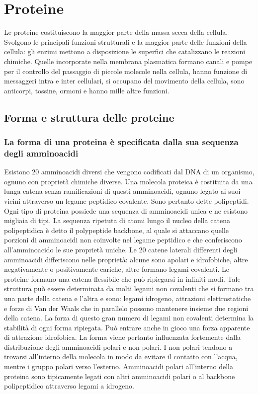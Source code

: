 \chapter{Proteine}
Le proteine costituiscono la maggior parte della massa secca della cellula. Svolgono le principali funzioni strutturali e la maggior parte delle funzioni
della cellula: gli enzimi mettono a disposizione le superfici che catalizzano le reazioni chimiche. Quelle incorporate nella membrana plasmatica formano 
canali e pompe per il controllo del passaggio di piccole molecole nella cellula, hanno funzione di messaggeri intra e inter cellulari, si occupano del
movimento della cellula, sono anticorpi, tossine, ormoni e hanno mille altre funzioni. 
\section{Forma e struttura delle proteine}
\subsection{La forma di una proteina \`e specificata dalla sua sequenza degli amminoacidi}
Esistono $20$ amminoacidi diversi che vengono codificati dal DNA di un organismo, ognuno con propriet\`a chimiche diverse. Una molecola proteica \`e
costituita da una lunga catena senza ramificazioni di questi amminoacidi, ognuno legato ai suoi vicini attraverso un legame peptidico covalente. Sono
pertanto dette polipeptidi. Ogni tipo di proteina possiede una sequenza di amminoacidi unica e ne esistono migliaia di tipi. La sequenza ripetuta di atomi 
lungo il nucleo della catena polipeptidica \`e detto il polypeptide backbone, al quale si attaccano quelle porzioni di amminoacidi non coinvolte nel 
legame peptidico e che conferiscono all'amminoacido le sue propriet\`a uniche. Le $20$ catene laterali differenti degli amminoacidi differiscono nelle
propriet\`a: alcune sono apolari e idrofobiche, altre negativamente o positivamente cariche, altre formano legami covalenti. Le proteine formano una 
catena flessibile che pu\`o ripiegarsi in infiniti modi. Tale struttura pu\`o essere determinata da molti legami non covalenti che si formano tra una 
parte della catena e l'altra e sono: legami idrogeno, attrazioni elettrostatiche e forze di Van der Waals che in parallelo possono mantenere insieme due 
regioni della catena. La forza di questo gran numero di legami non covalenti determina la stabilit\`a di ogni forma ripiegata. Pu\`o entrare anche in gioco
una forza apparente di attrazione idrofobica. La forma viene pertanto influenzata fortemente dalla distribuzione degli amminoacidi polari e non polari. I 
non polari tendono a trovarsi all'interno della molecola in modo da evitare il contatto con l'acqua, mentre i gruppo polari verso l'esterno. Amminoacidi
polari all'interno della proteina sono tipicamente legati con altri amminoacidi polari o al backbone polipeptidico attraverso legami a idrogeno.
